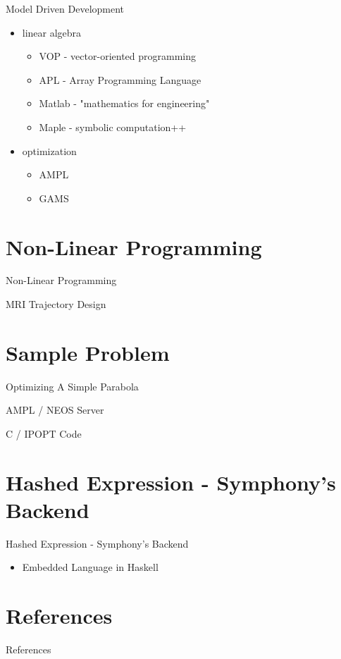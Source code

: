 \documentclass[presentation]{beamer}
\begin{document}
\begin{frame}{Model Driven Development}
\begin{itemize}
\item linear algebra
  \begin{itemize}
  \item VOP - vector-oriented programming
  \item APL - Array Programming Language
  \item Matlab - "mathematics for engineering"
  \item Maple - symbolic computation++
  \end{itemize}
\item optimization
  \begin{itemize}
  \item AMPL
  \item GAMS
  \end{itemize}
\end{itemize}
\end{frame}
\section{Non-Linear Programming}
\label{sec:org49ebdff}
\begin{frame}[label={sec:orgd027c63}]{Non-Linear Programming}
\end{frame}
\begin{frame}[label={sec:org4debd30}]{MRI Trajectory Design}
\end{frame}
\section{Sample Problem}
\label{sec:org6765f95}
\begin{frame}[label={sec:org0a594b7}]{Optimizing A Simple Parabola}
\end{frame}
\begin{frame}[label={sec:orgb450ab6}]{AMPL / NEOS Server}
\end{frame}
\begin{frame}[label={sec:org07fda49}]{C / IPOPT Code}
\end{frame}
\section{Hashed Expression - Symphony's Backend}
\label{sec:orga3e3bfb}
\begin{frame}[label={sec:org3131e28}]{Hashed Expression - Symphony's Backend}
\begin{itemize}
\item Embedded Language in \alert{Haskell}
\end{itemize}
\end{frame}
\section{References}
\label{sec:org51a8b04}
\begin{frame}[label={sec:org2b02857}]{References}
\printbibliography[heading=none]
\end{frame}
\end{document}
